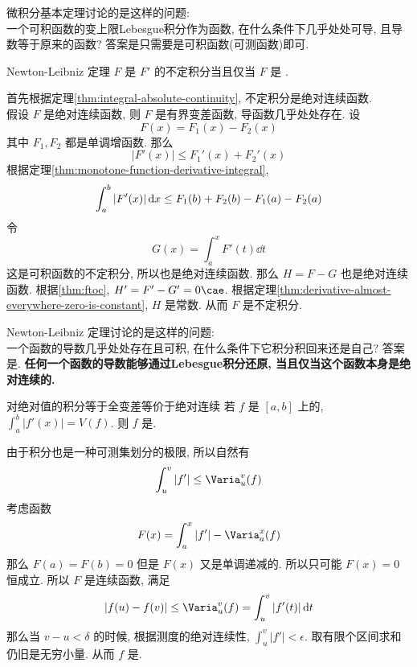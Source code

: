 \begin{rmk}
    微积分基本定理讨论的是这样的问题:\\
    \textrm{一个可积函数的变上限Lebesgue积分作为函数, 在什么条件下几乎处处可导, 且导数等于原来的函数?}
    答案是只需要是可积函数(可测函数)即可.
\end{rmk}
\begin{thm}
    {Newton-Leibniz 定理}
    \(F\) 是 \(F'\) 的不定积分当且仅当 \(F\) 是 \ACFunc{}.
\end{thm}
\begin{prf}
    首先根据定理\ref{thm:integral-absolute-continuity}, 不定积分是绝对连续函数. \\
    假设 \(F\) 是绝对连续函数, 则 \(F\) 是有界变差函数, 导函数几乎处处存在. 设
    \[F(x)=F_1(x)-F_2(x)\]
    其中 \(F_1,F_2\) 都是单调增函数. 那么
    \[|F'(x)|\leq F_1'(x)+F_2'(x)\]
    根据定理\ref{thm:monotone-function-derivative-integral}, 
    \[\int_a^b\abs{F'(x)}\dd{x}\leq F_1(b)+F_2(b)-F_1(a)-F_2(a)\]
    令
    \[G(x)=\int_a^x F'(t)\dd{t}\]
    这是可积函数的不定积分, 所以也是绝对连续函数. 那么 \(H=F-G\) 也是绝对连续函数. 根据\ref{thm:ftoc}, \(H'=F'-G'=0\cae\). 根据定理\ref{thm:derivative-almost-everywhere-zero-is-constant}, \(H\) 是常数. 从而 \(F\) 是不定积分.
\end{prf}
\begin{rmk}
    Newton-Leibniz 定理讨论的是这样的问题:\\
    \textrm{一个函数的导数几乎处处存在且可积, 在什么条件下它积分积回来还是自己?}
    答案是\ACFunc{}. \textbf{任何一个函数的导数能够通过Lebesgue积分还原, 当且仅当这个函数本身是绝对连续的.}
\end{rmk}
\begin{thm}
    {对绝对值的积分等于全变差等价于绝对连续}
    若 \(f\) 是 \([a,b]\) 上的\BVFunc{}, \(\int_a^b |f'(x)|=V(f)\). 则 \(f\) 是\ACFunc{}.
\end{thm}
\begin{prf}
    由于积分也是一种可测集划分的极限, 所以自然有
    \[\int_u^v|f'|\leq\Varia_u^v(f) \]
    考虑函数
    \[F(x)=\int_a^x |f'|-\Varia_a^x(f)\]
    那么 \(F(a)=F(b)=0\) 但是 \(F(x)\) 又是单调递减的. 所以只可能 \(F(x)=0\) 恒成立. 所以 \(F\) 是连续函数, 满足
    \[|f(u)-f(v)|\leq\Varia_u^v(f)=\int_u^v|f'(t)|\dd{t} \]
    那么当 \(v-u<\delta\) 的时候, 根据测度的绝对连续性, \(\int_u^v|f'|<\epsilon\). 取有限个区间求和仍旧是无穷小量. 从而 \(f\) 是\ACFunc{}.
\end{prf}
